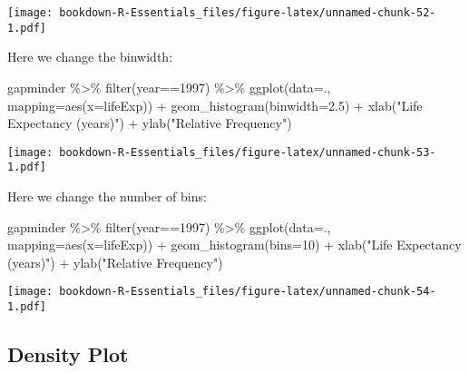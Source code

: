 \documentclass[
]{book}
\newenvironment{Shaded}{\begin{snugshade}}{\end{snugshade}}
\newcommand{\AttributeTok}[1]{\textcolor[rgb]{0.77,0.63,0.00}{#1}}
\newcommand{\DecValTok}[1]{\textcolor[rgb]{0.00,0.00,0.81}{#1}}
\newcommand{\FloatTok}[1]{\textcolor[rgb]{0.00,0.00,0.81}{#1}}
\newcommand{\FunctionTok}[1]{\textcolor[rgb]{0.00,0.00,0.00}{#1}}
\newcommand{\NormalTok}[1]{#1}
\newcommand{\SpecialCharTok}[1]{\textcolor[rgb]{0.00,0.00,0.00}{#1}}
\newcommand{\StringTok}[1]{\textcolor[rgb]{0.31,0.60,0.02}{#1}}
\begin{document}
\texttt{[image: bookdown-R-Essentials\_files/figure-latex/unnamed-chunk-52-1.pdf]}

Here we change the binwidth:

\begin{Shaded}
\begin{Highlighting}[]
\NormalTok{gapminder }\SpecialCharTok{\%\textgreater{}\%} \FunctionTok{filter}\NormalTok{(year}\SpecialCharTok{==}\DecValTok{1997}\NormalTok{) }\SpecialCharTok{\%\textgreater{}\%}
\FunctionTok{ggplot}\NormalTok{(}\AttributeTok{data=}\NormalTok{., }\AttributeTok{mapping=}\FunctionTok{aes}\NormalTok{(}\AttributeTok{x=}\NormalTok{lifeExp)) }\SpecialCharTok{+} 
  \FunctionTok{geom\_histogram}\NormalTok{(}\AttributeTok{binwidth=}\FloatTok{2.5}\NormalTok{) }\SpecialCharTok{+} 
  \FunctionTok{xlab}\NormalTok{(}\StringTok{"Life Expectancy (years)"}\NormalTok{) }\SpecialCharTok{+}
  \FunctionTok{ylab}\NormalTok{(}\StringTok{"Relative Frequency"}\NormalTok{)}
\end{Highlighting}
\end{Shaded}

\texttt{[image: bookdown-R-Essentials\_files/figure-latex/unnamed-chunk-53-1.pdf]}

Here we change the number of bins:

\begin{Shaded}
\begin{Highlighting}[]
\NormalTok{gapminder }\SpecialCharTok{\%\textgreater{}\%} \FunctionTok{filter}\NormalTok{(year}\SpecialCharTok{==}\DecValTok{1997}\NormalTok{) }\SpecialCharTok{\%\textgreater{}\%}
\FunctionTok{ggplot}\NormalTok{(}\AttributeTok{data=}\NormalTok{., }\AttributeTok{mapping=}\FunctionTok{aes}\NormalTok{(}\AttributeTok{x=}\NormalTok{lifeExp)) }\SpecialCharTok{+} 
  \FunctionTok{geom\_histogram}\NormalTok{(}\AttributeTok{bins=}\DecValTok{10}\NormalTok{) }\SpecialCharTok{+} 
  \FunctionTok{xlab}\NormalTok{(}\StringTok{"Life Expectancy (years)"}\NormalTok{) }\SpecialCharTok{+}
  \FunctionTok{ylab}\NormalTok{(}\StringTok{"Relative Frequency"}\NormalTok{)}
\end{Highlighting}
\end{Shaded}

\texttt{[image: bookdown-R-Essentials\_files/figure-latex/unnamed-chunk-54-1.pdf]}

\hypertarget{density-plot}{%
\subsection{Density Plot}\label{density-plot}}
\end{document}
